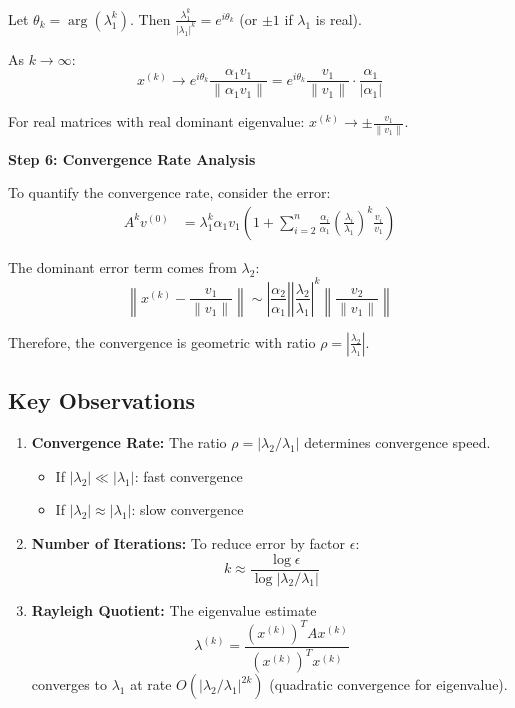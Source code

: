 \documentclass[12pt]{article}
\begin{document}
Let $\theta_k = \arg(\lambda_1^k)$. Then $\frac{\lambda_1^k}{|\lambda_1|^k} = e^{i\theta_k}$ (or $\pm 1$ if $\lambda_1$ is real).

As $k \to \infty$:
\begin{equation}
x^{(k)} \to e^{i\theta_k} \frac{\alpha_1 v_1}{\|\alpha_1 v_1\|} = e^{i\theta_k} \frac{v_1}{\|v_1\|} \cdot \frac{\alpha_1}{|\alpha_1|}
\end{equation}

For real matrices with real dominant eigenvalue: $x^{(k)} \to \pm \frac{v_1}{\|v_1\|}$.

\textbf{Step 6: Convergence Rate Analysis}

To quantify the convergence rate, consider the error:
\begin{align}
A^k v^{(0)} &= \lambda_1^k \alpha_1 v_1 \left(1 + \sum_{i=2}^{n} \frac{\alpha_i}{\alpha_1} \left(\frac{\lambda_i}{\lambda_1}\right)^k \frac{v_i}{v_1}\right)
\end{align}

The dominant error term comes from $\lambda_2$:
\begin{equation}
\left\|x^{(k)} - \frac{v_1}{\|v_1\|}\right\| \sim \left|\frac{\alpha_2}{\alpha_1}\right| \left|\frac{\lambda_2}{\lambda_1}\right|^k \left\|\frac{v_2}{\|v_1\|}\right\|
\end{equation}

Therefore, the convergence is geometric with ratio $\rho = \left|\frac{\lambda_2}{\lambda_1}\right|$.

\subsection*{Key Observations}

\begin{enumerate}
\item \textbf{Convergence Rate:} The ratio $\rho = |\lambda_2/\lambda_1|$ determines convergence speed.
\begin{itemize}
\item If $|\lambda_2| \ll |\lambda_1|$: fast convergence
\item If $|\lambda_2| \approx |\lambda_1|$: slow convergence
\end{itemize}

\item \textbf{Number of Iterations:} To reduce error by factor $\epsilon$:
\begin{equation}
k \approx \frac{\log \epsilon}{\log |\lambda_2/\lambda_1|}
\end{equation}

\item \textbf{Rayleigh Quotient:} The eigenvalue estimate
\begin{equation}
\lambda^{(k)} = \frac{(x^{(k)})^T A x^{(k)}}{(x^{(k)})^T x^{(k)}}
\end{equation}
converges to $\lambda_1$ at rate $O(|\lambda_2/\lambda_1|^{2k})$ (quadratic convergence for eigenvalue).
\end{enumerate}
\end{document}
